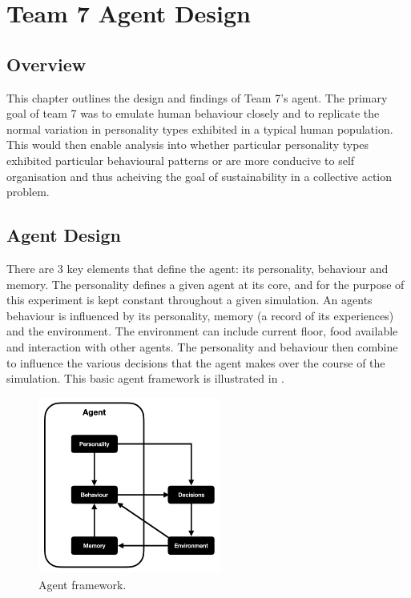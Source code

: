 \chapter{Team 7 Agent Design}\label{team_7_agent_design}

\section{Overview}
\label{sec: Team 7 Overview}
This chapter outlines the design and findings of Team 7's agent. The primary goal of team 7 was to emulate human behaviour closely and to replicate the normal variation in personality types exhibited in a typical human population. This would then enable analysis into whether particular personality types exhibited particular behavioural patterns or are more conducive to self organisation and thus acheiving the goal of sustainability in a collective action problem.

\section{Agent Design}
\label{sec: Agent Design}
There are 3 key elements that define the agent: its personality, behaviour and memory. The personality defines a given agent at its core, and for the purpose of this experiment is kept constant throughout a given simulation. An agents behaviour is influenced by its personality, memory (a record of its experiences) and the environment. The environment can include current floor, food available and interaction with other agents. The personality and behaviour then combine to influence the various decisions that the agent makes over the course of the simulation. 
This basic agent framework is illustrated in .

\begin{figure}[H]
    \begin{center}
        \includegraphics[width=6cm]
        {009_team_7_agent_design/Images/agent_flow.png}
    \end{center}
    \caption{Agent framework.}
    \label{agent_flow}
\end{figure}

